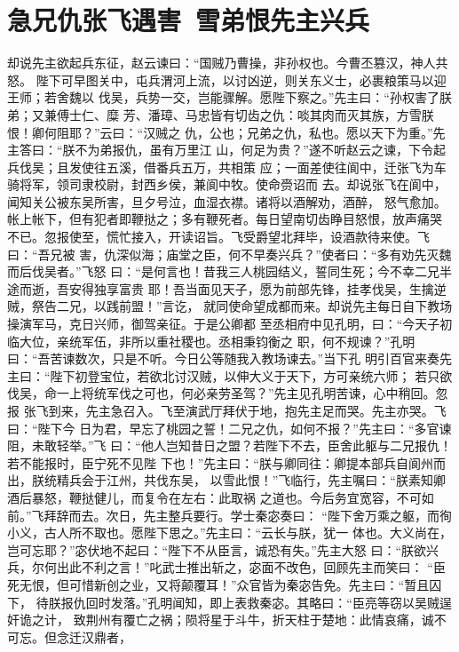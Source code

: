 \chapter{急兄仇张飞遇害~雪弟恨先主兴兵}

却说先主欲起兵东征，赵云谏曰：“国贼乃曹操，非孙权也。今曹丕篡汉，神人共怒。
陛下可早图关中，屯兵渭河上流，以讨凶逆，则关东义士，必裹粮策马以迎王师；若舍魏以
伐吴，兵势一交，岂能骤解。愿陛下察之。”先主曰：“孙权害了朕弟；又兼傅士仁、糜
芳、潘璋、马忠皆有切齿之仇：啖其肉而灭其族，方雪朕恨！卿何阻耶？”云曰：“汉贼之
仇，公也；兄弟之仇，私也。愿以天下为重。”先主答曰：“朕不为弟报仇，虽有万里江
山，何足为贵？”遂不听赵云之谏，下令起兵伐吴；且发使往五溪，借番兵五万，共相策
应；一面差使往阆中，迁张飞为车骑将军，领司隶校尉，封西乡侯，兼阆中牧。使命赍诏而
去。却说张飞在阆中，闻知关公被东吴所害，旦夕号泣，血湿衣襟。诸将以酒解劝，酒醉，
怒气愈加。帐上帐下，但有犯者即鞭挞之；多有鞭死者。每日望南切齿睁目怒恨，放声痛哭
不已。忽报使至，慌忙接入，开读诏旨。飞受爵望北拜毕，设酒款待来使。飞曰：“吾兄被
害，仇深似海；庙堂之臣，何不早奏兴兵？”使者曰：“多有劝先灭魏而后伐吴者。”飞怒
曰：“是何言也！昔我三人桃园结义，誓同生死；今不幸二兄半途而逝，吾安得独享富贵
耶！吾当面见天子，愿为前部先锋，挂孝伐吴，生擒逆贼，祭告二兄，以践前盟！”言讫，
就同使命望成都而来。却说先主每日自下教场操演军马，克日兴师，御驾亲征。于是公卿都
至丞相府中见孔明，曰：“今天子初临大位，亲统军伍，非所以重社稷也。丞相秉钧衡之
职，何不规谏？”孔明曰：“吾苦谏数次，只是不听。今日公等随我入教场谏去。”当下孔
明引百官来奏先主曰：“陛下初登宝位，若欲北讨汉贼，以伸大义于天下，方可亲统六师；
若只欲伐吴，命一上将统军伐之可也，何必亲劳圣驾？”先主见孔明苦谏，心中稍回。忽报
张飞到来，先主急召入。飞至演武厅拜伏于地，抱先主足而哭。先主亦哭。飞曰：“陛下今
日为君，早忘了桃园之誓！二兄之仇，如何不报？”先主曰：“多官谏阻，未敢轻举。”飞
曰：“他人岂知昔日之盟？若陛下不去，臣舍此躯与二兄报仇！若不能报时，臣宁死不见陛
下也！”先主曰：“朕与卿同往：卿提本部兵自阆州而出，朕统精兵会于江州，共伐东吴，
以雪此恨！”飞临行，先主嘱曰：“朕素知卿酒后暴怒，鞭挞健儿，而复令在左右：此取祸
之道也。今后务宜宽容，不可如前。”飞拜辞而去。次日，先主整兵要行。学士秦宓奏曰：
“陛下舍万乘之躯，而徇小义，古人所不取也。愿陛下思之。”先主曰：“云长与朕，犹一
体也。大义尚在，岂可忘耶？”宓伏地不起曰：“陛下不从臣言，诚恐有失。”先主大怒
曰：“朕欲兴兵，尔何出此不利之言！”叱武士推出斩之，宓面不改色，回顾先主而笑曰：
“臣死无恨，但可惜新创之业，又将颠覆耳！”众官皆为秦宓告免。先主曰：“暂且囚下，
待朕报仇回时发落。”孔明闻知，即上表救秦宓。其略曰：“臣亮等窃以吴贼逞奸诡之计，
致荆州有覆亡之祸；陨将星于斗牛，折天柱于楚地：此情哀痛，诚不可忘。但念迁汉鼎者，
